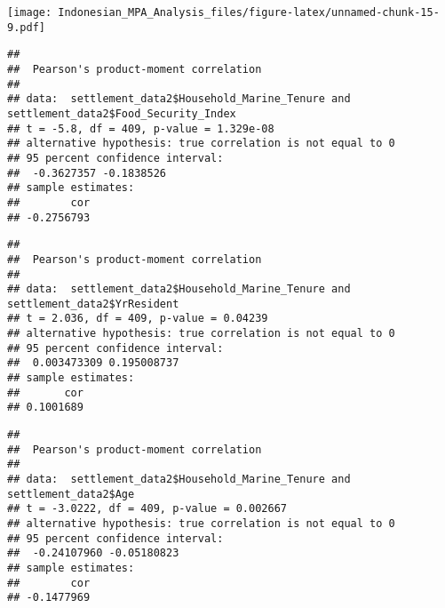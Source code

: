 \documentclass[
]{article}
\newenvironment{Shaded}{\begin{snugshade}}{\end{snugshade}}
\newcommand{\CommentTok}[1]{\textcolor[rgb]{0.56,0.35,0.01}{\textit{#1}}}
\newcommand{\FunctionTok}[1]{\textcolor[rgb]{0.13,0.29,0.53}{\textbf{#1}}}
\newcommand{\NormalTok}[1]{#1}
\newcommand{\SpecialCharTok}[1]{\textcolor[rgb]{0.81,0.36,0.00}{\textbf{#1}}}
\begin{document}
\texttt{[image: Indonesian\_MPA\_Analysis\_files/figure-latex/unnamed-chunk-15-9.pdf]}

\begin{Shaded}
\end{Shaded}

\begin{verbatim}
## 
##  Pearson's product-moment correlation
## 
## data:  settlement_data2$Household_Marine_Tenure and settlement_data2$Food_Security_Index
## t = -5.8, df = 409, p-value = 1.329e-08
## alternative hypothesis: true correlation is not equal to 0
## 95 percent confidence interval:
##  -0.3627357 -0.1838526
## sample estimates:
##        cor 
## -0.2756793
\end{verbatim}

\begin{Shaded}
\end{Shaded}

\begin{verbatim}
## 
##  Pearson's product-moment correlation
## 
## data:  settlement_data2$Household_Marine_Tenure and settlement_data2$YrResident
## t = 2.036, df = 409, p-value = 0.04239
## alternative hypothesis: true correlation is not equal to 0
## 95 percent confidence interval:
##  0.003473309 0.195008737
## sample estimates:
##       cor 
## 0.1001689
\end{verbatim}

\begin{Shaded}
\end{Shaded}

\begin{verbatim}
## 
##  Pearson's product-moment correlation
## 
## data:  settlement_data2$Household_Marine_Tenure and settlement_data2$Age
## t = -3.0222, df = 409, p-value = 0.002667
## alternative hypothesis: true correlation is not equal to 0
## 95 percent confidence interval:
##  -0.24107960 -0.05180823
## sample estimates:
##        cor 
## -0.1477969
\end{verbatim}
\end{document}

